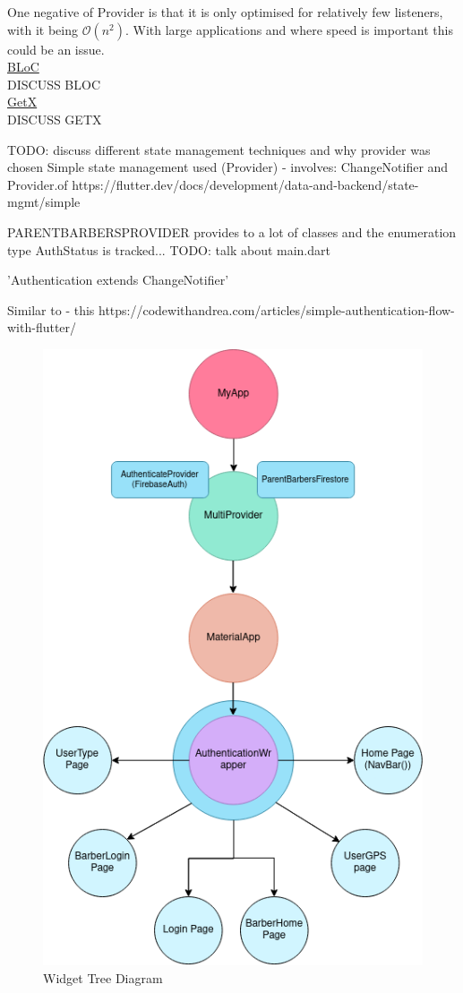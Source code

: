 \documentclass[12pt]{article}
\begin{document}
	One negative of Provider is that it is only optimised for relatively few listeners, with it being $\mathcal{O}(n^2)$. With large applications and where speed is important this could be an issue.
	\\
	
	\noindent \underline{BLoC}
	\\
	DISCUSS BLOC
	\\
	

	\noindent \underline{GetX}
	\\
	\noindent
	DISCUSS GETX
		
	TODO: discuss different state management techniques and why provider was chosen
	Simple state management used (Provider) -
	involves: ChangeNotifier and Provider.of
	https://flutter.dev/docs/development/data-and-backend/state-mgmt/simple
	
	PARENTBARBERSPROVIDER provides to a lot of classes and the enumeration type AuthStatus is tracked... TODO: talk about main.dart 
	
	'Authentication extends ChangeNotifier' {
	}
	
	Similar to - this https://codewithandrea.com/articles/simple-authentication-flow-with-flutter/ 
	
	
	\begin{figure}[H]
		\centering
		\includegraphics[scale=0.55]{images/widget-tree.png}
		\caption{Widget Tree Diagram}
		\label{fig:widget-tree}
	\end{figure}
\end{document}
